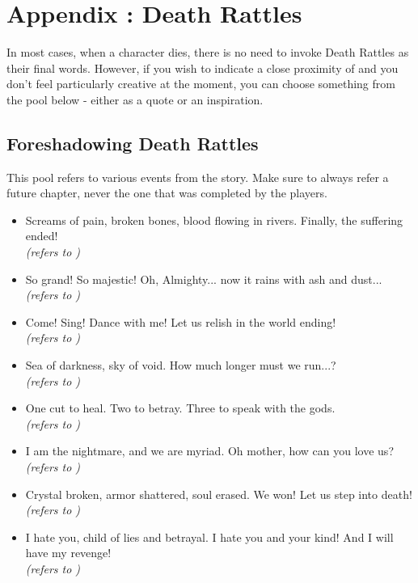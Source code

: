 \chapter{Appendix \thechapter{}: Death Rattles}
\label{chap:deathRattles}

In most cases, when a character dies, there is no need to invoke Death Rattles as their final words. However, if you wish to indicate a close proximity of \npcMoelach{} and you don't feel particularly creative at the moment, you can choose something from the pool below - either as a quote or an inspiration.


\section{Foreshadowing Death Rattles}
\label{sec:deathRattlesForeshadowing}

This pool refers to various events from the story. Make sure to always refer a future chapter, never the one that was completed by the players.

\begin{itemize}
	\item Screams of pain, broken bones, blood flowing in rivers. Finally, the suffering ended!
	\\ \textit{(refers to )}
	
	\item So grand! So majestic! Oh, Almighty... now it rains with ash and dust... 
	\\ \textit{(refers to )}
	
	\item Come! Sing! Dance with me! Let us relish in the world ending! 
	\\ \textit{(refers to )}
	
	\item Sea of darkness, sky of void. How much longer must we run...? 
	\\ \textit{(refers to )}
	
	\item One cut to heal. Two to betray. Three to speak with the gods.
	\\ \textit{(refers to )}
	
	\item I am the nightmare, and we are myriad. Oh mother, how can you love us?
	\\ \textit{(refers to )}
	
	\item Crystal broken, armor shattered, soul erased. We won! Let us step into death!
	\\ \textit{(refers to )}
	
	\item I hate you, child of lies and betrayal. I hate you and your kind! And I will have my revenge!
	\\ \textit{(refers to )}
\end{itemize}




